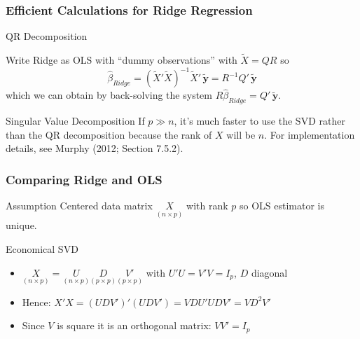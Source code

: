 \begin{frame}
  \frametitle{Efficient Calculations for Ridge Regression}
  

  \begin{block}{QR Decomposition}
    
  Write Ridge as OLS with ``dummy observations'' with $\widetilde{X} = QR$ so 
	$$\widehat{\beta}_{Ridge} = (\widetilde{X}' \widetilde{X})^{-1} \widetilde{X}'\,\widetilde{\textbf{y}} = R^{-1} Q' \,\widetilde{\textbf{y}}$$
which we can obtain by back-solving the system $R\widehat{\beta}_{Ridge} = Q'\, \widetilde{\mathbf{y}}$. 
  \end{block}

  \begin{block}{Singular Value Decomposition}
If $p \gg n$, it's much faster to use the SVD rather than the QR decomposition because the rank of $X$ will be $n$.
For implementation details, see Murphy (2012; Section 7.5.2).
  \end{block}
\end{frame}
\begin{frame}
  \frametitle{Comparing Ridge and OLS}

  \begin{block}{Assumption}
   Centered data matrix $\underset{(n\times p)}{X}$ with rank $p$ so OLS estimator is unique.
  \end{block}

  \begin{block}{Economical SVD}
    \begin{itemize}
      \item 
    $\underset{(n\times p)}{X} = \underset{(n\times p)}{U}\underset{(p\times p)}{D}\underset{(p\times p)}{V'}$ with $U'U = V'V = I_p$, $D$ diagonal 
  \item Hence: $X'X = (UDV')'(UDV')=VDU'UDV' = VD^2V'$
  \item Since $V$ is square it is an orthogonal matrix: $VV' = I_p$
    \end{itemize}
  \end{block}

\end{frame}
